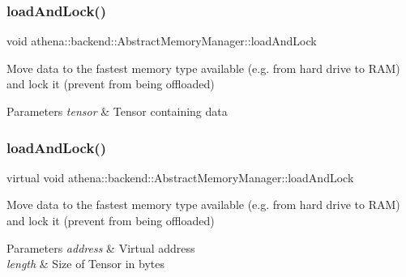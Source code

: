 \subsubsection{\texorpdfstring{load\+And\+Lock()}{loadAndLock()}\hspace{0.1cm}{\footnotesize\ttfamily [3/4]}}
{\footnotesize\ttfamily void athena\+::backend\+::\+Abstract\+Memory\+Manager\+::load\+And\+Lock}

Move data to the fastest memory type available (e.\+g. from hard drive to R\+AM) and lock it (prevent from being offloaded) 
\begin{DoxyParams}{Parameters}
{\em tensor} & Tensor containing data \\
\hline
\end{DoxyParams}
\mbox{\label{classathena_1_1backend_1_1generic_1_1_generic_memory_manager_a9fe52e4020802d6f526fba06adce8407}} 
\subsubsection{\texorpdfstring{load\+And\+Lock()}{loadAndLock()}\hspace{0.1cm}{\footnotesize\ttfamily [4/4]}}
{\footnotesize\ttfamily virtual void athena\+::backend\+::\+Abstract\+Memory\+Manager\+::load\+And\+Lock}

Move data to the fastest memory type available (e.\+g. from hard drive to R\+AM) and lock it (prevent from being offloaded) 
\begin{DoxyParams}{Parameters}
{\em address} & Virtual address \\
\hline
{\em length} & Size of Tensor in bytes \\
\hline
\end{DoxyParams}
\mbox{\label{classathena_1_1backend_1_1generic_1_1_generic_memory_manager_a978be661a46caaa8f6ef40a2c45a014e}} 

